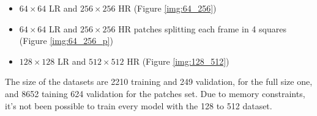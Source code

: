\begin{itemize}
  \item  \(64\times64\) LR and  \(256\times256\) HR (Figure \ref{img:64_256})
  \item  \(64\times64\) LR and  \(256\times256\) HR patches splitting each frame in 4 squares (Figure \ref{img:64_256_p})
  \item  \(128\times128\) LR and  \(512\times512\) HR (Figure \ref{img:128_512})
\end{itemize}

The size of the datasets are 2210 training and 249 validation, for the full size one, and 8652 taining 624 validation for the patches set. Due to memory constraints, it's not been possible to train every model with the 128 to 512 dataset.
